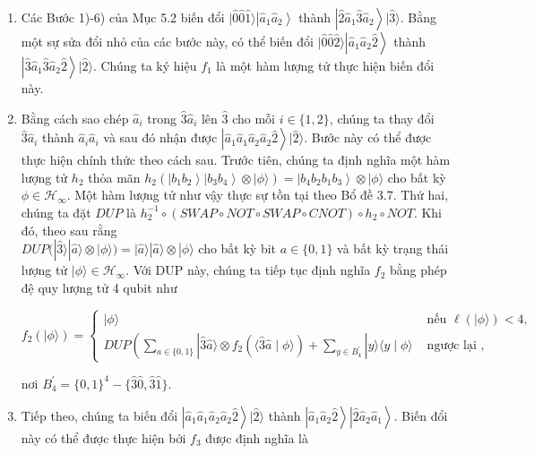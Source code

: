\documentclass[10pt]{article}
\begin{document}
\begin{enumerate}
  \item Các Bước 1)-6) của Mục 5.2 biến đổi $|\hat{0} \hat{0} \hat{1}\rangle\left|\hat{a}_{1} \hat{a}_{2}\right\rangle$ thành $\left|\hat{2} \hat{a}_{1} \hat{3} \hat{a}_{2}\right\rangle|\hat{3}\rangle$. Bằng một sự sửa đổi nhỏ của các bước này, có thể biến đổi $|\hat{0} \hat{0} \hat{2}\rangle\left|\hat{a}_{1} \hat{a}_{2} \hat{2}\right\rangle$ thành $\left|\hat{3} \hat{a}_{1} \hat{3} \hat{a}_{2} \hat{2}\right\rangle|\hat{2}\rangle$. Chúng ta ký hiệu $f_{1}$ là một hàm lượng tử thực hiện biến đổi này.
  \item Bằng cách sao chép $\hat{a}_{i}$ trong $\hat{3} \hat{a}_{i}$ lên $\hat{3}$ cho mỗi $i \in\{1,2\}$, chúng ta thay đổi $\hat{3} \hat{a}_{i}$ thành $\hat{a}_{i} \hat{a}_{i}$ và sau đó nhận được $\left|\hat{a}_{1} \hat{a}_{1} \hat{a}_{2} \hat{a}_{2} \hat{2}\right\rangle|\hat{2}\rangle$. Bước này có thể được thực hiện chính thức theo cách sau. Trước tiên, chúng ta định nghĩa một hàm lượng tử $h_{2}$ thỏa mãn $h_{2}\left(\left|b_{1} b_{2}\right\rangle\left|b_{3} b_{4}\right\rangle \otimes|\phi\rangle\right)=\left|b_{4} b_{2} b_{1} b_{3}\right\rangle \otimes|\phi\rangle$ cho bất kỳ $\phi \in \mathcal{H}_{\infty}$. Một hàm lượng tử như vậy thực sự tồn tại theo Bổ đề 3.7. Thứ hai, chúng ta đặt $D U P$ là $h_{2}^{-1} \circ(S W A P \circ N O T \circ S W A P \circ C N O T) \circ h_{2} \circ N O T$. Khi đó, theo sau rằng\\
$D U P(|\hat{3}\rangle|\hat{a}\rangle \otimes|\phi\rangle)=|\hat{a}\rangle|\hat{a}\rangle \otimes|\phi\rangle$ cho bất kỳ bit $a \in\{0,1\}$ và bất kỳ trạng thái lượng tử $|\phi\rangle \in \mathcal{H}_{\infty}$. Với DUP này, chúng ta tiếp tục định nghĩa $f_{2}$ bằng phép đệ quy lượng tử 4 qubit như

$$
f_{2}(|\phi\rangle)= \begin{cases}|\phi\rangle & \text { nếu } \ell(|\phi\rangle)<4, \\ D U P\left(\sum_{a \in\{0,1\}}|\hat{3} \hat{a}\rangle \otimes f_{2}(\langle\hat{3} \hat{a} \mid \phi\rangle)+\sum_{y \in B_{4}^{\prime}}|y\rangle\langle y \mid \phi\rangle\right. & \text { ngược lại },\end{cases}
$$

nơi $B_{4}^{\prime}=\{0,1\}^{4}-\{\hat{3} \hat{0}, \hat{3} \hat{1}\}$.\\
  \item Tiếp theo, chúng ta biến đổi $\left|\hat{a}_{1} \hat{a}_{1} \hat{a}_{2} \hat{a}_{2} \hat{2}\right\rangle|\hat{2}\rangle$ thành $\left|\hat{a}_{1} \hat{a}_{2} \hat{2}\right\rangle\left|\hat{2} \hat{a}_{2} \hat{a}_{1}\right\rangle$. Biến đổi này có thể được thực hiện bởi $f_{3}$ được định nghĩa là


\end{enumerate}
\end{document}
